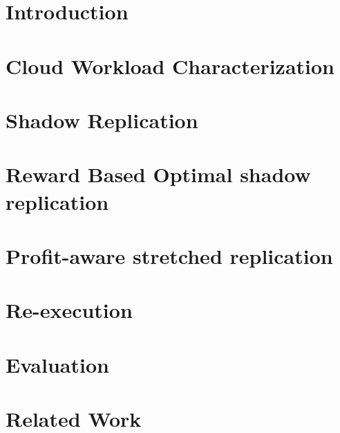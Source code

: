 \documentclass[journal,article,accept,moreauthors,pdftex,12pt,a4paper,energies]{mdpi}
\begin{document}

\section{Introduction}
\label{sec:introduction}


\section{Cloud Workload Characterization}
\label{sec:cloud_computing_workload}


\section{Shadow Replication}
\label{sec:shadow_replication}


%

\section{Reward Based Optimal shadow replication}
\label{sec:reward_model}


\section{Profit-aware stretched replication}
\label{sec:reward_model_2}


\section{Re-execution}
\label{sec:reward_model_3}


\section{Evaluation}
\label{sec:evaluation}


\section{Related Work}
\label{sec:related_work}

\end{document}
